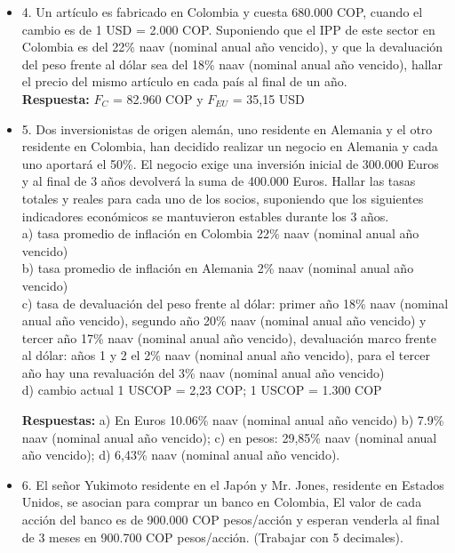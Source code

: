 \begin{itemize}
 \item 4. Un  artículo  es  fabricado en  Colombia  y  cuesta 680.000 COP,  cuando  el cambio es de 1 USD = 2.000 COP. Suponiendo que el IPP de este sector en Colombia es del 22\% naav (nominal anual año vencido), y que la devaluación del peso frente al dólar sea del 18\% naav (nominal anual año vencido), hallar el precio del mismo artículo en cada país al final de un año.\\
       \textbf{Respuesta:} $F_{C}$ = 82.960 COP y $F_{EU}$ = 35,15 USD\\
       \medskip

 \item 5. Dos  inversionistas  de  origen  alemán,  uno  residente  en  Alemania  y el  otro residente  en  Colombia,  han  decidido  realizar  un  negocio  en  Alemania  y cada uno aportará el 50\%. El negocio exige una inversión inicial de 300.000  Euros   y   al   final   de   3   años   devolverá   la   suma   de 400.000 Euros. Hallar las tasas totales y reales para cada uno de los socios, suponiendo  que  los  siguientes  indicadores  económicos  se  mantuvieron estables durante los 3 años.\\

       a) tasa promedio de inflación en Colombia 22\% naav (nominal anual año vencido)\\
       b) tasa promedio de inflación en Alemania 2\% naav (nominal anual año vencido)\\
       c) tasa  de  devaluación  del  peso  frente  al  dólar:  primer  año  18\% naav (nominal anual año vencido), segundo  año  20\% naav (nominal anual año vencido)  y  tercer  año  17\% naav (nominal anual año vencido),  devaluación  marco frente  al  dólar:  años  1  y  2  el  2\% naav (nominal anual año vencido),  para  el  tercer  año  hay  una revaluación del 3\% naav (nominal anual año vencido)\\
       d) cambio actual 1 USCOP  =  2,23 COP; 1 USCOP = 1.300 COP

       \textbf{Respuestas:} a) En Euros 10.06\% naav (nominal anual año vencido) b) 7.9\% naav (nominal anual año vencido); c) en pesos: 29,85\% naav (nominal anual año vencido); d) 6,43\% naav (nominal anual año vencido).\\
       \medskip

 \item 6. El señor Yukimoto residente en el Japón y Mr. Jones, residente en Estados Unidos,  se  asocian para comprar un banco en Colombia, El valor de cada acción del banco es de 900.000 COP pesos/acción y esperan venderla al final de 3 meses en 900.700 COP pesos/acción. (Trabajar con 5 decimales).\\


\end{itemize}
